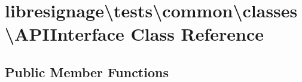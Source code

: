 \hypertarget{classlibresignage_1_1tests_1_1common_1_1classes_1_1APIInterface}{}\section{libresignage\textbackslash{}tests\textbackslash{}common\textbackslash{}classes\textbackslash{}A\+P\+I\+Interface Class Reference}
\label{classlibresignage_1_1tests_1_1common_1_1classes_1_1APIInterface}
\subsection*{Public Member Functions}
